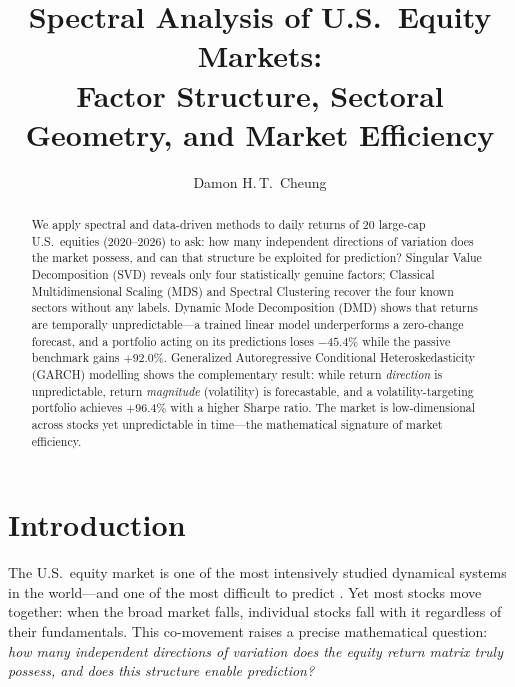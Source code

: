 \documentclass[runningheads]{llncs}
\begin{document}
\title{Spectral Analysis of U.S.\ Equity Markets:\\
Factor Structure, Sectoral Geometry, and Market Efficiency}

\author{Damon H.\,T.\ Cheung}

\maketitle

\begin{abstract}
We apply spectral and data-driven methods to daily returns of 20 large-cap
U.S.\ equities (2020--2026) to ask: how many independent directions of variation
does the market possess, and can that structure be exploited for prediction?
Singular Value Decomposition (SVD) reveals only four statistically genuine factors;
Classical Multidimensional Scaling (MDS) and Spectral Clustering recover the four
known sectors without any labels.
Dynamic Mode Decomposition (DMD) shows that returns are temporally unpredictable—a
trained linear model underperforms a zero-change forecast, and a portfolio acting
on its predictions loses $-45.4\%$ while the passive benchmark gains $+92.0\%$.
Generalized Autoregressive Conditional Heteroskedasticity (GARCH) modelling shows
the complementary result: while return \emph{direction} is unpredictable, return
\emph{magnitude} (volatility) is forecastable, and a volatility-targeting portfolio
achieves $+96.4\%$ with a higher Sharpe ratio.
The market is low-dimensional across stocks yet unpredictable in time—the
mathematical signature of market efficiency.
\end{abstract}


\section{Introduction}

The U.S.\ equity market is one of the most intensively studied dynamical systems
in the world—and one of the most difficult to predict \citep{fama1970efficient}.
Yet most stocks move together: when the broad market falls, individual stocks
fall with it regardless of their fundamentals.
This co-movement raises a precise mathematical question:
\emph{how many independent directions of variation does the equity return matrix
truly possess, and does this structure enable prediction?}
\end{document}
